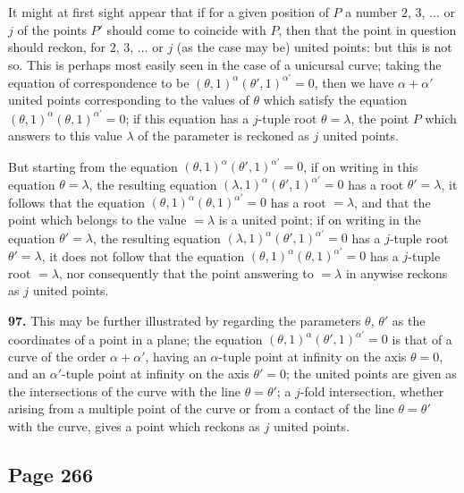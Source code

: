\documentclass[11pt,a4paper]{article}
\theoremstyle{definition}
\begin{document}
It might at first sight appear that if for a given position of $P$ a number $2$, $3$, $\ldots$ or $j$ of the points $P'$ should come to coincide with $P$, then that the point in question should reckon, for $2$, $3$, $\ldots$ or $j$ (as the case may be) united points: but this is not so. This is perhaps most easily seen in the case of a unicursal curve; taking the equation of correspondence to be $(\theta, 1)^{\alpha}(\theta', 1)^{\alpha'} = 0$, then we have $\alpha + \alpha'$ united points corresponding to the values of $\theta$ which satisfy the equation $(\theta, 1)^{\alpha}(\theta, 1)^{\alpha'} = 0$; if this equation has a $j$-tuple root $\theta = \lambda$, the point $P$ which answers to this value $\lambda$ of the parameter is reckoned as $j$ united points.

But starting from the equation $(\theta, 1)^{\alpha}(\theta', 1)^{\alpha'} = 0$, if on writing in this equation $\theta = \lambda$, the resulting equation $(\lambda, 1)^{\alpha}(\theta', 1)^{\alpha'} = 0$ has a root $\theta' = \lambda$, it follows that the equation $(\theta, 1)^{\alpha}(\theta, 1)^{\alpha'} = 0$ has a root $= \lambda$, and that the point which belongs to the value $= \lambda$ is a united point; if on writing in the equation $\theta' = \lambda$, the resulting equation $(\lambda, 1)^{\alpha}(\theta', 1)^{\alpha'} = 0$ has a $j$-tuple root $\theta' = \lambda$, it does not follow that the equation $(\theta, 1)^{\alpha}(\theta, 1)^{\alpha'} = 0$ has a $j$-tuple root $= \lambda$, nor consequently that the point answering to $= \lambda$ in anywise reckons as $j$ united points.

\noindent\textbf{97.} This may be further illustrated by regarding the parameters $\theta$, $\theta'$ as the coordinates of a point in a plane; the equation $(\theta, 1)^{\alpha}(\theta', 1)^{\alpha'} = 0$ is that of a curve of the order $\alpha + \alpha'$, having an $\alpha$-tuple point at infinity on the axis $\theta = 0$, and an $\alpha'$-tuple point at infinity on the axis $\theta' = 0$; the united points are given as the intersections of the curve with the line $\theta = \theta'$; a $j$-fold intersection, whether arising from a multiple point of the curve or from a contact of the line $\theta = \theta'$ with the curve, gives a point which reckons as $j$ united points.

\subsection*{Page 266}
\end{document}
